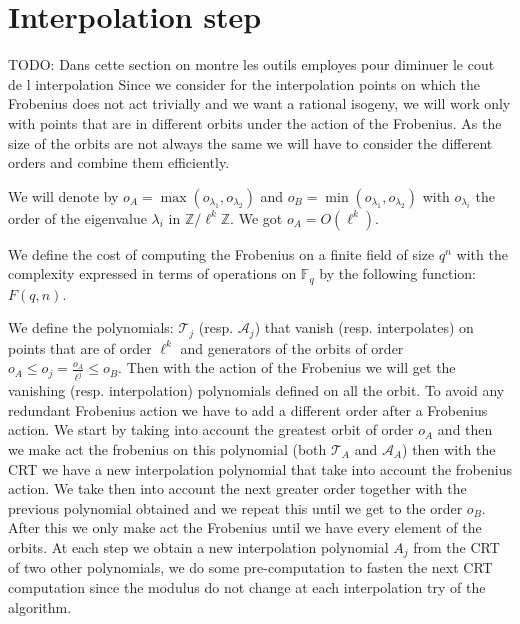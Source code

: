 \documentclass{lms}
\newcommand{\todo}[1]{{\color{red}TODO: #1}}
\begin{document}

\section{Interpolation step}
\label{sec:interpolation}
\todo{Dans cette section on montre les outils employes pour diminuer le cout de l interpolation}
Since we consider for the interpolation points on which the Frobenius does not act trivially and we want a rational isogeny, we will work only with points that are in different orbits under the action of the Frobenius. As the size of the orbits are not always the same we will have to consider the different orders and combine them efficiently.

\begin{defi}
We will denote by $o_A=\max(o_{\lambda_1},o_{\lambda_2})$ and $o_B=\min(o_{\lambda_1},o_{\lambda_2})$ with $o_{\lambda_i}$ the order of the eigenvalue $\lambda_i$ in $\mathbb{Z}/\ell^k\mathbb{Z}$. We got $o_A=O(\ell^k)$.
\end{defi}

\begin{defi}
We define the cost of computing the Frobenius on a finite field of size $q^{n}$ with the complexity expressed in terms of operations on $\mathbb{F}_q$ by the following function: $F(q,n)$.
\end{defi}

We define the polynomials: $\mathcal{T}_j$ (resp. $\mathcal{A}_j$) that vanish (resp. interpolates) on points that are of order $\ell^k$ and generators of the orbits of order  $o_A \leqslant o_j=\frac{o_A}{\ell^j} \leqslant o_B$. Then with the action of the Frobenius we will get the vanishing (resp. interpolation) polynomials defined on all the orbit. To avoid any redundant Frobenius action we have to add a different order after a Frobenius action. %
\newline
We start by taking into account the greatest orbit of order $o_A$ and then we make act the frobenius on this polynomial (both $\mathcal{T}_A$ and $\mathcal{A}_A$) then with the CRT we have a new interpolation polynomial that take into account the frobenius action. We take then into account the next greater order together with the previous polynomial obtained and we repeat this until we get to the order $o_B$. After this we only make act the Frobenius until we have every element of the orbits.
\newline
At each step we obtain a new interpolation polynomial $A_j$ from the CRT of two other polynomials, we do some pre-computation to fasten the next CRT computation since the modulus do not change at each interpolation try of the algorithm.
\end{document}
